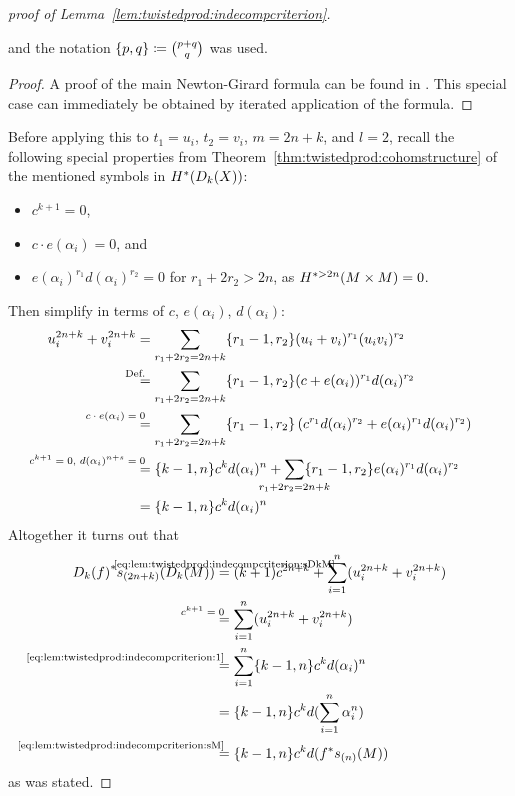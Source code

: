 \begin{proof}[proof of Lemma~\ref{lem:twistedprod:indecompcriterion}]
\begin{Lem}
    and the notation $\{p,q\}\coloneqq \binom{p+q}{q}$
    was used.
    \begin{proof}
      A proof of the main Newton-Girard formula can be found in
      \cite[Theorem~10.12.2]{raymond}. This special case can
      immediately be obtained by iterated application of the formula.
    \end{proof}
  \end{Lem}
  Before applying this to $t_1=u_i$, $t_2=v_i$, $m=2n+k$, and $l=2$,
  recall the following special properties from
  Theorem~\ref{thm:twistedprod:cohomstructure} of the mentioned symbols in
  $H^*(D_{k}({X}))$:
  \begin{itemize}
  \item $c^{k+1}=0$,
  \item $c\cdot e(\alpha_i)=0$, and
  \item $e(\alpha_i)^{r_1}d(\alpha_i)^{r_2} = 0$ for $r_1+2r_2>2n$,
    as $H^{*>2n}(M\times M)=0$.
  \end{itemize}
  Then simplify in terms of $c$, $e(\alpha_i)$, $d(\alpha_i)$:
  \begin{align}\notag
    u_i^{2n+k} + v_i^{2n+k}
    &=
      \sum_{{r_1+2r_2=2n+k}}
      \altbinom{r_1-1}{r_2} (u_i+v_i)^{r_1}(u_iv_i)^{r_2} \\\notag
    &\equalsby{Def.}
      \sum_{{r_1+2r_2=2n+k}}
      \altbinom{r_1-1}{r_2}
      (c+e(\alpha_i))^{r_1}d(\alpha_i)^{r_2} \\\notag
    &\equalsby{$c\cdot e(\alpha_i)=0$}
      \sum_{{r_1+2r_2=2n+k}} \altbinom{r_1-1}{r_2}
      \left(c^{r_1}d(\alpha_i)^{r_2}+e(\alpha_i)^{r_1}d(\alpha_i)^{r_2}\right) \\\notag
    &\equalsby{$c^{k+1}=0$, $d(\alpha_i)^{n+s}=0$}
      \altbinom{k-1}{n} c^k d(\alpha_i)^n
      + \sum_{\mathclap{r_1+2r_2=2n+k}} \altbinom{r_1-1}{r_2}
      e(\alpha_i)^{r_1}d(\alpha_i)^{r_2} \\
    \label{eq:lem:twistedprod:indecompcriterion:1}
    &= \altbinom{k-1}{n} c^k d(\alpha_i)^n      
  \end{align}
  Altogether it turns out that
  \begin{align*}
    \pb{\Twistedprod{k}{f}}\s{(2n+k)}(\Twistedprod{k}{M})
    &\cequalsby{\eqref{eq:lem:twistedprod:indecompcriterion:sDkM}}
      (k+1)c^{2n+k} + \sum_{i=1}^n (u_i^{2n+k} + v_i^{2n+k}) \\
    &\equalsby{$c^{k+1}=0$}
      \sum_{i=1}^n (u_i^{2n+k} + v_i^{2n+k}) \\
    &\equalsby{\eqref{eq:lem:twistedprod:indecompcriterion:1}}
      \sum_{i=1}^n \altbinom{k-1}{n} c^k d(\alpha_i)^n \\
    &= \altbinom{k-1}{n} c^k d(\sum_{i=1}^n \alpha_i^n) \\
    &\equalsby{\eqref{eq:lem:twistedprod:indecompcriterion:sM}}
      \altbinom{k-1}{n} c^k d(\pb f \s{(n)}(M))
  \end{align*}
  as was stated.
\end{proof}

